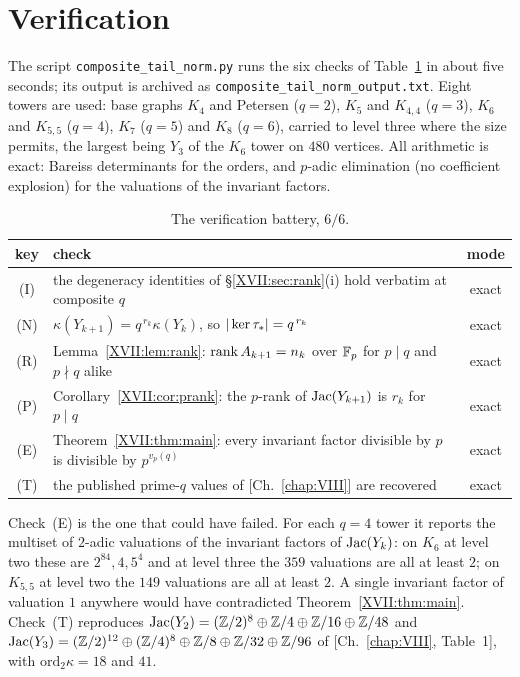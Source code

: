 \section{Verification}\label{XVII:sec:battery}

The script \texttt{composite\_tail\_norm.py} runs the six checks of
Table~\ref{XVII:tab:battery} in about five seconds; its output is archived as
\texttt{composite\_tail\_norm\_output.txt}. Eight towers are used: base graphs $K_4$ and
Petersen ($q=2$), $K_5$ and $K_{4,4}$ ($q=3$), $K_6$ and $K_{5,5}$ ($q=4$), $K_7$ ($q=5$)
and $K_8$ ($q=6$), carried to level three where the size permits, the largest being
$Y_3$ of the $K_6$ tower on $480$ vertices. All arithmetic is exact: Bareiss determinants
for the orders, and $p$-adic elimination (no coefficient explosion) for the valuations of
the invariant factors.

\begin{table}[ht]
\centering\small
\begin{tabular}{clc}
\toprule
key & check & mode\\
\midrule
(I) & the degeneracy identities of \S\ref{XVII:sec:rank}(i) hold verbatim at composite $q$ & exact\\
(N) & $\kappa(Y_{k+1})=q^{\,r_k}\kappa(Y_k)$, so $|\ker\tau_*|=q^{\,r_k}$ & exact\\
(R) & Lemma~\ref{XVII:lem:rank}: $\operatorname{rank} A_{k+1}=n_k$ over $\mathbb{F}_p$ for $p\mid q$ and $p\nmid q$ alike & exact\\
(P) & Corollary~\ref{XVII:cor:prank}: the $p$-rank of $\operatorname{Jac}(Y_{k+1})$ is $r_k$ for $p\mid q$ & exact\\
(E) & Theorem~\ref{XVII:thm:main}: every invariant factor divisible by $p$ is divisible by $p^{v_p(q)}$ & exact\\
(T) & the published prime-$q$ values of [Ch.~\ref{chap:VIII}] are recovered & exact\\
\bottomrule
\end{tabular}
\caption{The verification battery, $6/6$.}
\label{XVII:tab:battery}
\end{table}

Check~(E) is the one that could have failed. For each $q=4$ tower it reports the
multiset of $2$-adic valuations of the invariant factors of $\operatorname{Jac}(Y_k)$: on $K_6$ at
level two these are $2^{84},4,5^4$ and at level three the $359$ valuations are all at
least $2$; on $K_{5,5}$ at level two the $149$ valuations are all at least $2$. A single
invariant factor of valuation $1$ anywhere would have contradicted
Theorem~\ref{XVII:thm:main}. Check~(T) reproduces
$\operatorname{Jac}(Y_2)=(\mathbb{Z}/2)^8\oplus\mathbb{Z}/4\oplus\mathbb{Z}/16\oplus\mathbb{Z}/48$ and
$\operatorname{Jac}(Y_3)=(\mathbb{Z}/2)^{12}\oplus(\mathbb{Z}/4)^8\oplus\mathbb{Z}/8\oplus\mathbb{Z}/32\oplus\mathbb{Z}/96$ of [Ch.~\ref{chap:VIII}, Table~1],
with $\mathrm{ord}_2\kappa=18$ and $41$.

